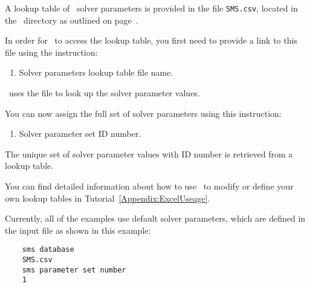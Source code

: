 \label{section:SolverParameters}
A lookup table of \mfus\ solver parameters is provided in the file \texttt{SMS.csv}, located in the \bin\ directory as outlined on page~\pageref{page:userbin}.

\pagebreak
In order for \mut\ to access the lookup table, you first need to provide a link to this file using the instruction:

    {
        \squish
        \begin{enumerate}
        \item {}  Solver parameters lookup table file name.
        \end{enumerate}
          \mut\ uses the file  to look up the solver parameter values.
    }

You can now assign the full set of solver parameters using this instruction:

    {
        \squish
        \begin{enumerate}
        \item {}  Solver parameter set ID number.
        \end{enumerate}
          The unique set of solver parameter values with ID number  is retrieved from a lookup table.
    }

You can find detailed information about how to use \dbase\ to modify or define your own lookup tables in Tutorial~\ref{Appendix:ExcelUseage}.

Currently, all of the examples use default solver parameters, which are defined in the input file as shown in this example:
\begin{verbatim}
    sms database
    SMS.csv
    sms parameter set number
    1
\end{verbatim}

